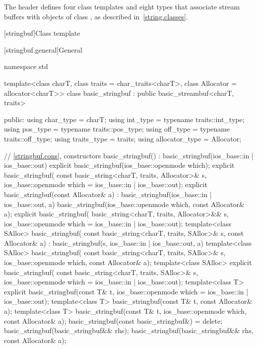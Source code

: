 \pnum
The header  defines four class templates
and eight types that associate stream buffers with objects of class
,
%
as described in~\ref{string.classes}.

[stringbuf]{Class template }

[stringbuf.general]{General}
%
\begin{codeblock}
namespace std {
  template<class charT, class traits = char_traits<charT>, class Allocator = allocator<charT>>
  class basic_stringbuf : public basic_streambuf<charT, traits> {
  public:
    using char_type      = charT;
    using int_type       = typename traits::int_type;
    using pos_type       = typename traits::pos_type;
    using off_type       = typename traits::off_type;
    using traits_type    = traits;
    using allocator_type = Allocator;

    // \ref{stringbuf.cons}, constructors
    basic_stringbuf() : basic_stringbuf(ios_base::in | ios_base::out) {}
    explicit basic_stringbuf(ios_base::openmode which);
    explicit basic_stringbuf(
      const basic_string<charT, traits, Allocator>& s,
      ios_base::openmode which = ios_base::in | ios_base::out);
    explicit basic_stringbuf(const Allocator& a)
      : basic_stringbuf(ios_base::in | ios_base::out, a) {}
    basic_stringbuf(ios_base::openmode which, const Allocator& a);
    explicit basic_stringbuf(
      basic_string<charT, traits, Allocator>&& s,
      ios_base::openmode which = ios_base::in | ios_base::out);
    template<class SAlloc>
      basic_stringbuf(
        const basic_string<charT, traits, SAlloc>& s, const Allocator& a)
        : basic_stringbuf(s, ios_base::in | ios_base::out, a) {}
    template<class SAlloc>
      basic_stringbuf(
        const basic_string<charT, traits, SAlloc>& s,
        ios_base::openmode which, const Allocator& a);
    template<class SAlloc>
      explicit basic_stringbuf(
        const basic_string<charT, traits, SAlloc>& s,
        ios_base::openmode which = ios_base::in | ios_base::out);
    template<class T>
      explicit basic_stringbuf(const T& t,
                               ios_base::openmode which = ios_base::in | ios_base::out);
    template<class T>
      basic_stringbuf(const T& t, const Allocator& a);
    template<class T>
      basic_stringbuf(const T& t, ios_base::openmode which, const Allocator& a);
    basic_stringbuf(const basic_stringbuf&) = delete;
    basic_stringbuf(basic_stringbuf&& rhs);
    basic_stringbuf(basic_stringbuf&& rhs, const Allocator& a);

}}
\end{codeblock}
